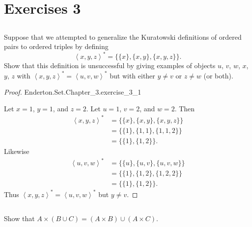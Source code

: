 \documentclass{report}
\begin{document}
\section{Exercises 3}%
\label{sec:exercises-3}

\subsection{}%
\label{sub:exercise-3.1}

Suppose that we attempted to generalize the Kuratowski definitions of ordered
  pairs to ordered triples by defining
  $$\left< x, y, z \right>^* = \{\{x\}, \{x, y\}, \{x, y, z\}\}.$$
Show that this definition is unsuccessful by giving examples of objects
  $u$, $v$, $w$, $x$, $y$, $z$ with
  $\left< x, y, z \right>^* = \left< u, v, w \right>^*$ but with either
  $y \neq v$ or $z \neq w$ (or both).

\begin{proof}

    {Enderton.Set.Chapter\_3.exercise\_3\_1}

  Let $x = 1$, $y = 1$, and $z = 2$.
  Let $u = 1$, $v = 2$, and $w = 2$.
  Then
    \begin{align*}
      \left< x, y, z \right>^*
        & = \{\{x\}, \{x, y\}, \{x, y, z\}\} \\
        & = \{\{1\}, \{1, 1\}, \{1, 1, 2\}\} \\
        & = \{\{1\}, \{1, 2\}\}.
    \end{align*}
  Likewise
    \begin{align*}
      \left< u, v, w \right>^*
        & = \{\{u\}, \{u, v\}, \{u, v, w\}\} \\
        & = \{\{1\}, \{1, 2\}, \{1, 2, 2\}\} \\
        & = \{\{1\}, \{1, 2\}\}.
    \end{align*}
  Thus $\left< x, y, z \right>^* = \left< u, v, w \right>^*$ but $y \neq v$.

\end{proof}

\subsection{}%
\label{sub:exercise-3.2a}

Show that $A \times (B \cup C) = (A \times B) \cup (A \times C)$.
\end{document}
